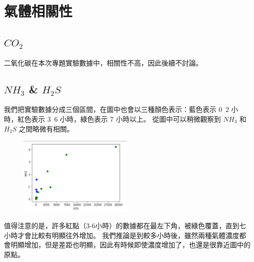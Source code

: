 \section{氣體相關性}
	\subsection{$CO_2$}
		二氧化碳在本次專題實驗數據中，相關性不高，因此後續不討論。
	\subsection{$NH_3$ \& $H_2S$}
		我們把實驗數據分成三個區間，在圖中也會以三種顏色表示：藍色表示 0~2 小時，紅色表示 3~6 小時，綠色表示 7 小時以上。
		從圖中可以稍微觀察到 $NH_3$ 和 $H_2S$ 之間略微有相關。
		\begin{figure}[H]
			\centering
			\includegraphics[width=0.5\textwidth]{pic/NH3_H2S.png}
		\end{figure}
		值得注意的是，許多紅點（3-6小時）的數據都在最左下角，被綠色覆蓋，直到七小時才會比較有明顯往外增加。
		我們推論是到較多小時後，雖然兩種氣體濃度都會明顯增加，但是差距也明顯，因此有時候即使濃度增加了，也還是很靠近圖中的原點。
